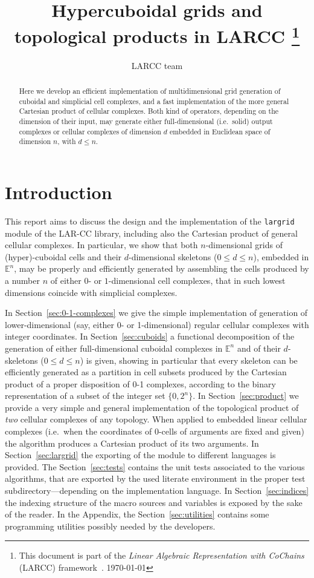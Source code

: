 \documentclass[11pt,oneside]{article}	%
\title{Hypercuboidal grids and topological products in LARCC
\footnote{This document is part of the \emph{Linear Algebraic Representation with CoChains} (LARCC) framework~\cite{cclar-proj:2013:00}. \today}
}
\author{LARCC team}
\def\E{\mathbb{E}}
\begin{document}
\maketitle
\nonstopmode

\begin{abstract}
Here we develop an efficient implementation of multidimensional grid generation of cuboidal and simplicial cell complexes, and a fast implementation of the more general Cartesian product of cellular complexes. Both kind of operators, depending on the dimension of their input, may generate either full-dimensional (i.e.~solid) output complexes or cellular complexes of dimension $d$ embedded in Euclidean space of dimension $n$, with $d\leq n$. 
\end{abstract}

\tableofcontents
\newpage

\section{Introduction}

This report aims to discuss the design and the implementation of the \texttt{largrid} module of the LAR-CC library, including also the Cartesian product of general cellular complexes. 
In particular, we show that both $n$-dimensional grids of (hyper)-cuboidal cells and their  $d$-dimensional skeletons ($0\leq d\leq n$), embedded in $\E^n$, may be properly and efficiently generated by assembling the cells produced by a number $n$ of either $0$- or $1$-dimensional cell complexes, that in such lowest dimensions coincide with simplicial complexes. 

In Section~\ref{sec:0-1-complexes} we give the simple implementation of generation of lower-dimensional (say, either 0- or 1-dimensional) regular cellular complexes with integer coordinates.
In Section~\ref{sec:cuboids} a functional decomposition of the generation of either full-dimensional cuboidal complexes in $\E^n$ and of their $d$-skeletons ($0\leq d\leq n$) is given, showing in particular that every skeleton can be efficiently generated as a partition in cell subsets produced by the Cartesian product of a proper disposition of 0-1 complexes, according to the binary representation of a subset of the integer set $\{0,2^n\}$.
In Section~\ref{sec:product} we provide a very simple and general implementation of the topological product of \emph{two} cellular complexes of any topology. When applied to embedded linear cellular complexes (i.e.~when the coordinates of 0-cells of arguments are fixed and given) the algorithm produces a Cartesian product of its two arguments.
In Section~\ref{sec:largrid} the exporting of the module to different languages is provided.
The Section~\ref{sec:tests} contains the unit tests associated to the various algorithms, that are exported by the used literate environment in the proper test subdirectory---depending on the implementation language.
In Section~\ref{sec:indices} the indexing structure of the macro sources and variables is exposed by the sake of the reader. 
In the Appendix, the Section~\ref{sec:utilities} contains some programming utilities possibly needed by the developers.
\end{document}
